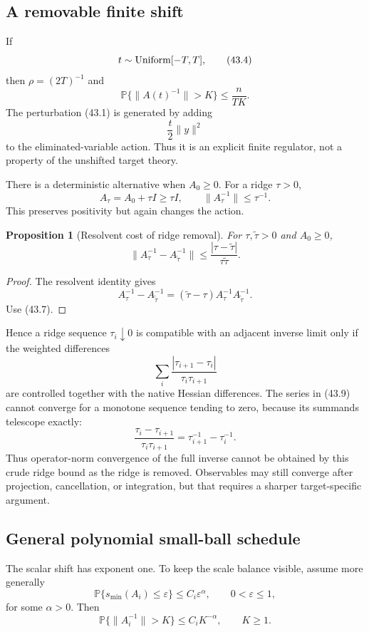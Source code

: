 \documentclass[11pt]{article}
\newtheorem{proposition}[theorem]{Proposition}
\begin{document}
\subsection{A removable finite shift}

If
\[
 t\sim{\rm Uniform}[-T,T],
 \tag{43.4}
\]
then \(\rho=(2T)^{-1}\) and
\[
 \mathbb P\{\|A(t)^{-1}\|>K\}
 \leq\frac n{TK}.
 \tag{43.5}
\]
The perturbation (43.1) is generated by adding
\[
 \frac t2\|y\|^2
 \tag{43.6}
\]
to the eliminated-variable action.  Thus it is an explicit finite
regulator, not a property of the unshifted target theory.

There is a deterministic alternative when \(A_0\geq0\).  For a ridge
\(\tau>0\),
\[
 A_\tau=A_0+\tau I\geq\tau I,
 \qquad
 \|A_\tau^{-1}\|\leq\tau^{-1}.
 \tag{43.7}
\]
This preserves positivity but again changes the action.

\begin{proposition}[Resolvent cost of ridge removal]
\label{prop:v11v43-ridge}
For \(\tau,\widetilde\tau>0\) and \(A_0\geq0\),
\[
 \|A_\tau^{-1}-A_{\widetilde\tau}^{-1}\|
 \leq
 \frac{|\tau-\widetilde\tau|}
 {\tau\widetilde\tau}.
 \tag{43.8}
\]
\end{proposition}

\begin{proof}
The resolvent identity gives
\[
 A_\tau^{-1}-A_{\widetilde\tau}^{-1}
 =
 (\widetilde\tau-\tau)
 A_\tau^{-1}A_{\widetilde\tau}^{-1}.
\]
Use (43.7).
\end{proof}

Hence a ridge sequence \(\tau_i\downarrow0\) is compatible with an
adjacent inverse limit only if the weighted differences
\[
 \sum_i
 \frac{|\tau_{i+1}-\tau_i|}
 {\tau_i\tau_{i+1}}
 \tag{43.9}
\]
are controlled together with the native Hessian differences.  The
series in (43.9) cannot converge for a monotone sequence tending to
zero, because its summands telescope exactly:
\[
 \frac{\tau_i-\tau_{i+1}}{\tau_i\tau_{i+1}}
 =
 \tau_{i+1}^{-1}-\tau_i^{-1}.
 \tag{43.10}
\]
Thus operator-norm convergence of the full inverse cannot be obtained
by this crude ridge bound as the ridge is removed.  Observables may
still converge after projection, cancellation, or integration, but
that requires a sharper target-specific argument.

\subsection{General polynomial small-ball schedule}

The scalar shift has exponent one.  To keep the scale balance visible,
assume more generally
\[
 \mathbb P\{s_{\min}(A_i)\leq\varepsilon\}
 \leq C_i\varepsilon^\alpha,
 \qquad 0<\varepsilon\leq1,
 \tag{43.11}
\]
for some \(\alpha>0\).  Then
\[
 \mathbb P\{\|A_i^{-1}\|>K\}
 \leq C_iK^{-\alpha},
 \qquad K\geq1.
 \tag{43.12}
\]
\end{document}
